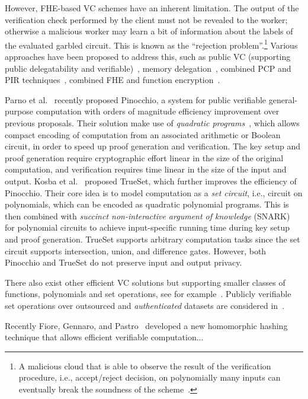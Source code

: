 However, FHE-based VC schemes have an inherent limitation.
The output of the verification check performed by the client must not be revealed to the worker; otherwise a malicious worker may learn a bit of information about the labels of the evaluated garbled circuit.
This is known as the ``rejection problem''.\footnote{A malicious cloud that is able to observe the result of the verification procedure, i.e., accept/reject decision, on polynomially many inputs can eventually break the soundness of the scheme~\cite{PRV12}.}
Various approaches have been proposed to address this, such as public VC (supporting public delegatability and verifiable)~\cite{PRV12,PST13}, memory delegation~\cite{CKL+11}, combined PCP and PIR techniques~\cite{BCC+12}, combined FHE and function encryption~\cite{BF12}.

Parno et al.~\cite{PHG+13} recently proposed Pinocchio, a system for public verifiable general-purpose computation with orders of magnitude efficiency improvement over previous proposals.
Their solution make use of {\em quadratic programs}~\cite{GGP+13}, which allows compact encoding of computation from an associated arithmetic or Boolean circuit, in order to speed up proof generation and verification.
The key setup and proof generation require cryptographic effort linear in the size of the original computation, and verification requires time linear in the size of the input and output.
Kosba et al.~\cite{KPP+14} proposed {\sc TrueSet}, which further improves the efficiency of Pinocchio.
Their core idea is to model computation as a {\em set circuit}, i.e., circuit on polynomials, which can be encoded as quadratic polynomial programs.
This is then combined with {\em succinct non-interactive argument of knowledge} (SNARK)~\cite{GGP+13} for polynomial circuits to achieve input-specific running time during key setup and proof generation.
{\sc TrueSet} supports arbitrary computation tasks since the set circuit supports intersection, union, and difference gates.
However, both Pinocchio and {\sc TrueSet} do not preserve input and output privacy.

There also exist other efficient VC solutions but supporting smaller classes of functions, polynomials and set operations, see for example~\cite{BGV11,PTT11,FG12}.
Publicly verifiable set operations over outsourced and {\em authenticated} datasets are considered in~\cite{CPP+14}.

Recently Fiore, Gennaro, and Pastro~\cite{FGP14} developed a new homomorphic hashing technique that allows efficient verifiable computation...

